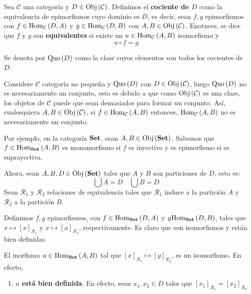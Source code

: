 \documentclass[12pt]{report}
\theoremstyle{largebreak}
\newcommand{\Obj}[1]{\ensuremath{\textup{Obj}\left(#1\right)}}
\newcommand{\Hom}[3]{\ensuremath{\textup{Hom}_{#1}\left(#2,#3\right)}}
\newcommand{\Cat}[1]{\ensuremath{\textup{\textbf{#1}}}}
\newcommand{\Quo}[1]{\ensuremath{\textup{Quo}\left(#1 \right)}}
\begin{document}
    \begin{mydef}
        Sea $\mathcal{C}$ una categoría y $D\in\Obj{\mathcal{C}}$. Definimos el \textbf{cociente de $D$} como la equivalencia de epimorfismos cuyo dominio es $D$, es decir, sean $f,g$ epimorfismos con $f\in\Hom{\mathcal{C}}{D}{A}$ y $g\in\Hom{\mathcal{C}}{D}{B}$ con $A,B\in\Obj{\mathcal{C}}$. Enotnces, se dice que $f$ y $g$ son \textbf{equivalentes} si existe un $u\in\Hom{\mathcal{C}}{A}{B}$ isomorfismo y
        \begin{equation*}
            u\circ f = g
        \end{equation*}
    \end{mydef}

    \begin{obs}
        Se denota por $\Quo{D}$ como la clase cuyos elementos son todos los cocientes de $D$.
    \end{obs}

    \begin{obs}
        Considere $\mathcal{C}$ categoría no pequeña y $\Quo{D}$ con $D\in\Obj{\mathcal{C}}$, luego $\Quo{D}$ no es necesariamente un conjunto, esto es debido a que como $\Obj{\mathcal{C}}$ es una clase, los objetos de $\mathcal{C}$ puede que sean demasiados para formar un conjunto.
        Así, cualesquiera $A,B\in\Obj{\mathcal{C}}$, si $f\in\Hom{\mathcal{C}}{A}{B}$ entonces, $\Hom{\mathcal{C}}{A}{B}$ no es necesariamente un conjunto.
    \end{obs}

    \begin{exa}
        Por ejemplo, en la categoría $\Cat{Set}$, sean $A,B\in\Obj{\Cat{Set}}$. Sabemos que $f\in\Hom{\Cat{Set}}{A}{B}$ es monomorfismo si $f$ es inyectiva y es epimorfismo si es suprayectiva.

        Ahora, sean $A,B,D\in\Obj{\Cat{Set}}$ tales que $A$ y $B$ son particiones de $D$, esto es:
        \begin{equation*}
            \bigcup A = D\quad\bigcup B = D
        \end{equation*}
        Sean $\mathcal{R}_1$ y $\mathcal{R}_2$ relaciones de equivalencia tales que $\mathcal{R}_1$ induce a la partición $A$ y $\mathcal{R}_2$ a la partición $B$.

        Definimos $f,g$ epimorfismos, con $f\in\Hom{\Cat{Set}}{D}{A}$ y $g\Hom{\Cat{Set}}{D}{B}$, tales que $x\mapsto \left[x \right]_{ \mathcal{R}_1}$ y $x\mapsto \left[x \right]_{ \mathcal{R}_2}$, respectivamente. Es claro que son isomorfismos y están bien definidas.

        El morfismo $u\in\Hom{\Cat{Set}}{A}{B}$ tal que $\left[x \right]_{\mathcal{R}_1}\mapsto \left[y \right]_{\mathcal{R}_2}$, es un isomorfismo. En efecto,
        \begin{enumerate}
            \item \textbf{$u$ está bien definida}. En efecto, sean $x_1,x_2\in D$ tales que $\left[x_1 \right]_{\mathcal{R}_1}=\left[ x_2\right]_{\mathcal{R}_2}$
        \end{enumerate}

    \end{exa}
\end{document}
